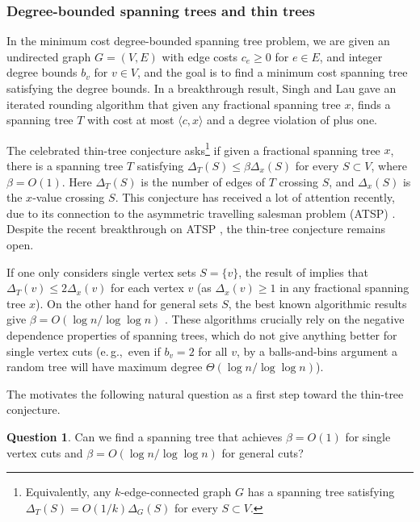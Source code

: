\documentclass[11pt]{article}
\newcommand{\ip}[1]{\langle #1 \rangle}
\theoremstyle{definition}
\newcommand{\eg}{e.\,g.}
\newtheorem{question}[theorem]{Question}
\begin{document}
\subsubsection{Degree-bounded spanning trees and thin trees}
In the minimum cost degree-bounded spanning tree problem, we are
given an undirected graph $G=(V,E)$ with edge costs $c_e \geq 0$ for $e \in E$, and integer degree bounds $b_v$ for $v \in V$,
and the goal is to find a minimum cost spanning tree satisfying the degree bounds.
In a breakthrough result, Singh and Lau \cite{SL07} gave an iterated rounding algorithm that given any fractional spanning tree $x$, finds a spanning tree $T$ with cost at most $\ip{c, x}$ and a degree violation of plus one.





%



The celebrated thin-tree conjecture asks\footnote{Equivalently, any $k$-edge-connected graph $G$ has a spanning  tree satisfying ~$\Delta_T(S) = O(1/k) \Delta_G(S)$ for every $S \subset V$.} if given a fractional spanning tree $x$, there is a spanning tree $T$ satisfying $ \Delta_T(S) \leq \beta \Delta_x(S)$ for every $S\subset{V}$, where $\beta=O(1)$. Here $\Delta_T(S)$ is the number of edges of $T$ crossing $S$, and $\Delta_x(S)$ is the $x$-value crossing $S$.
 This conjecture has received a lot of attention recently, due to its connection to the asymmetric travelling salesman problem (ATSP) \cite{AGMOS10, AO15}. Despite the recent breakthrough on ATSP \cite{STV18}, the thin-tree conjecture remains open.


If one only considers single vertex sets $S = \{v\}$, 
the result of \cite{SL07} implies that $\Delta_T(v) \leq 2 \Delta_x(v)$ for each vertex $v$ (as $\Delta_x(v) \geq 1$ in any fractional spanning tree $x$). 
On the other hand for general sets $S$, the best known algorithmic results give $\beta=O(\log n /\log \log n)$ \cite{AGMOS10,CVZ10,SV14,HO14}.
These algorithms crucially rely on the negative dependence properties of spanning trees, which do not give anything better for single vertex cuts
(\eg,~even if $b_v=2$ for all $v$, by a balls-and-bins argument a random tree will have maximum degree $\Theta(\log n/\log \log n)$).

The motivates the following natural question as a first step toward the thin-tree conjecture.
\begin{question}
Can we find a spanning tree that achieves $\beta=O(1)$ for single vertex cuts and $\beta=O(\log n/\log \log n)$ for general cuts?
\end{question} 
\end{document}
